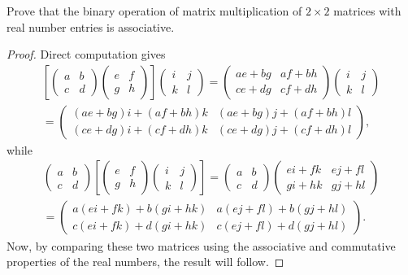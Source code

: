  Prove that the binary operation of matrix multiplication of
$2\times2$ matrices with real number entries is associative.
\begin{proof}
  Direct computation gives
  \begin{multline*}
    \left[
      \begin{pmatrix}
        a & b \\
        c & d
      \end{pmatrix}
      \begin{pmatrix}
        e & f \\
        g & h
      \end{pmatrix}
    \right]
    \begin{pmatrix}
      i & j \\
      k & l
    \end{pmatrix}
    =
    \begin{pmatrix}
      ae+bg & af+bh \\
      ce+dg & cf+dh
    \end{pmatrix}
    \begin{pmatrix}
      i & j \\
      k & l
    \end{pmatrix} \\
    =
    \begin{pmatrix}
      (ae+bg)i + (af+bh)k & (ae+bg)j + (af+bh)l \\
      (ce+dg)i + (cf+dh)k & (ce+dg)j + (cf+dh)l
    \end{pmatrix},
  \end{multline*}
  while
  \begin{multline*}
    \begin{pmatrix}
      a & b \\
      c & d
    \end{pmatrix}
    \left[
      \begin{pmatrix}
        e & f \\
        g & h
      \end{pmatrix}
      \begin{pmatrix}
        i & j \\
        k & l
      \end{pmatrix}
    \right]
    =
    \begin{pmatrix}
      a & b \\
      c & d
    \end{pmatrix}
    \begin{pmatrix}
      ei + fk & ej + fl \\
      gi + hk & gj + hl
    \end{pmatrix} \\
    =
    \begin{pmatrix}
      a(ei+fk) + b(gi+hk) & a(ej+fl) + b(gj+hl) \\
      c(ei+fk) + d(gi+hk) & c(ej+fl) + d(gj+hl)
    \end{pmatrix}.
  \end{multline*}
  Now, by comparing these two matrices using the associative and
  commutative properties of the real numbers, the result will follow.
\end{proof}
